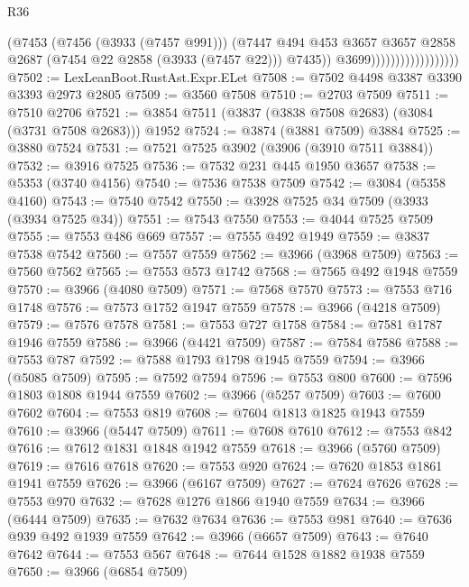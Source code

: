 \begin{lexlean}{R36}
\begin{coremodule}
                                        (@7453
                                          (@7456 (@3933 (@7457 @991)))
                                          (@7447
                                            @494
                                            @453
                                            @3657
                                            @3657
                                            @2858
                                            @2687
                                            (@7454 @22 @2858 (@3933 (@7457 @22)))
                                            @7435))
                                        @3699))))))))))))))))))
@7502 := LexLeanBoot.RustAst.Expr.ELet
@7508 := @7502 @4498 @3387 @3390 @3393 @2973 @2805
@7509 := @3560 @7508
@7510 := @2703 @7509
@7511 := @7510 @2706
@7521 := @3854 @7511 (@3837 (@3838 @7508 @2683) (@3084 (@3731 @7508 @2683))) @1952
@7524 := @3874 (@3881 @7509) @3884
@7525 := @3880 @7524
@7531 := @7521 @7525 @3902 (@3906 (@3910 @7511 @3884))
@7532 := @3916 @7525
@7536 := @7532 @231 @445 @1950 @3657
@7538 := @5353 (@3740 @4156)
@7540 := @7536 @7538 @7509
@7542 := @3084 (@5358 @4160)
@7543 := @7540 @7542
@7550 := @3928 @7525 @34 @7509 (@3933 (@3934 @7525 @34))
@7551 := @7543 @7550
@7553 := @4044 @7525 @7509
@7555 := @7553 @486 @669
@7557 := @7555 @492 @1949
@7559 := @3837 @7538 @7542
@7560 := @7557 @7559
@7562 := @3966 (@3968 @7509)
@7563 := @7560 @7562
@7565 := @7553 @573 @1742
@7568 := @7565 @492 @1948 @7559
@7570 := @3966 (@4080 @7509)
@7571 := @7568 @7570
@7573 := @7553 @716 @1748
@7576 := @7573 @1752 @1947 @7559
@7578 := @3966 (@4218 @7509)
@7579 := @7576 @7578
@7581 := @7553 @727 @1758
@7584 := @7581 @1787 @1946 @7559
@7586 := @3966 (@4421 @7509)
@7587 := @7584 @7586
@7588 := @7553 @787
@7592 := @7588 @1793 @1798 @1945 @7559
@7594 := @3966 (@5085 @7509)
@7595 := @7592 @7594
@7596 := @7553 @800
@7600 := @7596 @1803 @1808 @1944 @7559
@7602 := @3966 (@5257 @7509)
@7603 := @7600 @7602
@7604 := @7553 @819
@7608 := @7604 @1813 @1825 @1943 @7559
@7610 := @3966 (@5447 @7509)
@7611 := @7608 @7610
@7612 := @7553 @842
@7616 := @7612 @1831 @1848 @1942 @7559
@7618 := @3966 (@5760 @7509)
@7619 := @7616 @7618
@7620 := @7553 @920
@7624 := @7620 @1853 @1861 @1941 @7559
@7626 := @3966 (@6167 @7509)
@7627 := @7624 @7626
@7628 := @7553 @970
@7632 := @7628 @1276 @1866 @1940 @7559
@7634 := @3966 (@6444 @7509)
@7635 := @7632 @7634
@7636 := @7553 @981
@7640 := @7636 @939 @492 @1939 @7559
@7642 := @3966 (@6657 @7509)
@7643 := @7640 @7642
@7644 := @7553 @567
@7648 := @7644 @1528 @1882 @1938 @7559
@7650 := @3966 (@6854 @7509)

\end{coremodule}
\end{lexlean}
